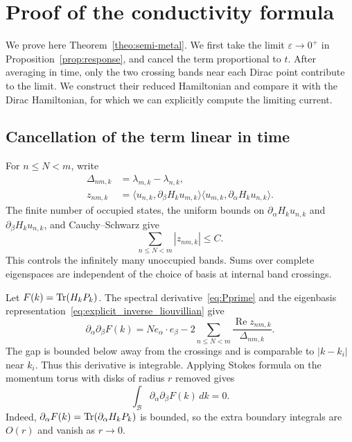 \documentclass[a4paper,11pt]{article}
\theoremstyle{plain}
\theoremstyle{remark}
\def\eps{{\varepsilon}}
\begin{document}
\section{Proof of the conductivity formula}\label{sec:semimet}

We prove here Theorem~\ref{theo:semi-metal}. We first take the limit
$\eps\to0^+$ in Proposition~\ref{prop:response}, and cancel the term
proportional to $t$. After averaging in time, only the two crossing
bands near each Dirac point contribute to the limit. We construct
their reduced Hamiltonian and compare it with the Dirac Hamiltonian,
for which we can explicitly compute the limiting current.

\subsection{Cancellation of the term linear in time}
\label{sec:band_cancellation}

For $n\le N<m$, write
\begin{align}\label{eq:transition_data}
\Delta_{nm,k}&=\lambda_{m,k}-\lambda_{n,k},\nonumber\\
z_{nm,k}&=\langle u_{n,k},\partial_\beta H_ku_{m,k}\rangle
\langle u_{m,k},\partial_\alpha H_ku_{n,k}\rangle.
\end{align}
The finite number of occupied states, the uniform bounds on
$\partial_\alpha H_ku_{n,k}$ and $\partial_\beta H_ku_{n,k}$,
and Cauchy--Schwarz give
\begin{equation}\label{eq:transition_bound}
\sum_{n\le N<m}|z_{nm,k}|\le C.
\end{equation}
This controls the infinitely many unoccupied bands. Sums over complete
eigenspaces are independent of the choice of basis at internal band crossings.

Let $F(k)=\Tr(H_kP_k)$. The spectral derivative~\eqref{eq:Pprime}
and the eigenbasis representation~\eqref{eq:explicit_inverse_liouvillian}
give
\[
\partial_\alpha\partial_\beta F(k)
=N e_\alpha\cdot e_\beta
-2\sum_{n\le N<m}\frac{\operatorname{Re}z_{nm,k}}{\Delta_{nm,k}}.
\]
The gap is bounded below away from the crossings and is comparable
to $|k-k_i|$ near $k_i$. Thus this derivative is integrable.
Applying Stokes formula on the momentum torus with disks of radius $r$
removed gives
\begin{equation}\label{eq:filled_band_cancellation}
\int_{\mathcal B}\partial_\alpha\partial_\beta F(k)\,dk=0.
\end{equation}
Indeed, $\partial_\alpha F(k)=\Tr(\partial_\alpha H_kP_k)$ is bounded,
so the extra boundary integrals are $O(r)$ and vanish as $r\to0$.
\end{document}
